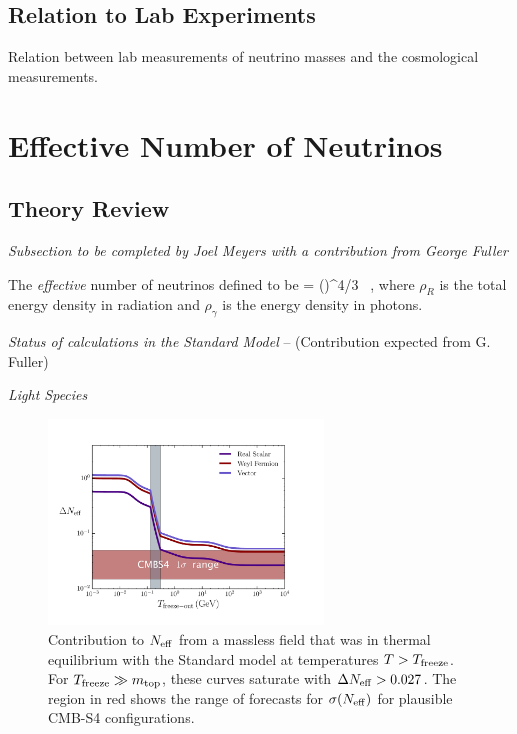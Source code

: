 \subsection{Relation to Lab Experiments}

Relation between lab measurements of neutrino masses and the cosmological measurements.

\section{Effective Number of Neutrinos}

\subsection{Theory Review}

{\it Subsection to be completed by Joel Meyers with a contribution from George Fuller}

The {\it effective} number of neutrinos defined to be
\beq
\Neff= \left(\right)^{4/3}   \ ,
\eeq
where $\rho_{R}$ is the total energy density in radiation and $\rho_\gamma$ is the energy density in photons. 

{\it Status of calculations in the Standard Model} -- (Contribution expected from G. Fuller)


{\it Light Species}

\begin{figure}[t!]
\begin{center}
\includegraphics[width=0.65\textwidth]{Neutrinos/Neff.pdf}
\caption{Contribution to $N_{\rm eff}$ from a massless field that was in thermal equilibrium with the Standard model at temperatures $T> T_{\rm freeze}$.  For $T_{\rm freeze} \gg m_{\rm top}$, these curves saturate with $\Delta N_{\rm eff} > 0.027$.   The region in red shows the range of forecasts for $\sigma(N_{\rm eff})$ for plausible CMB-S4 configurations. }
\label{fig:limits}
\end{center}
\end{figure}

